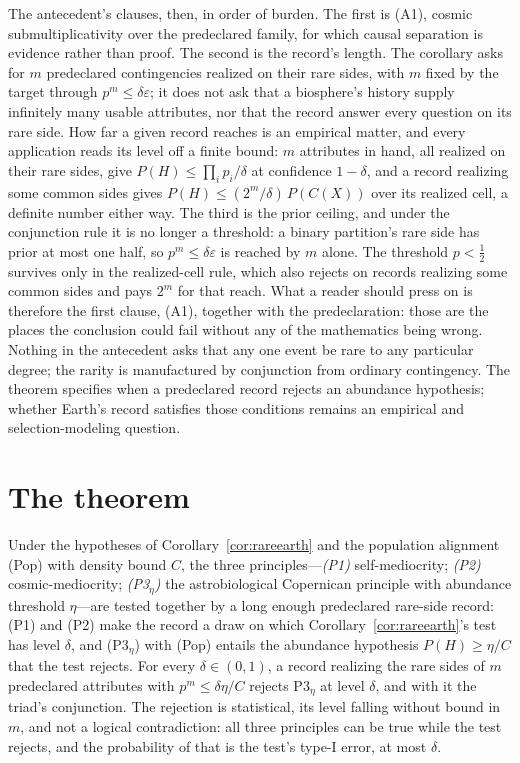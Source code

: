 The antecedent's clauses, then, in order of burden. The first is {\rm (A1)}, cosmic submultiplicativity over the predeclared family, for which causal separation is evidence rather than proof. The second is the record's length. The corollary asks for $m$ predeclared contingencies realized on their rare sides, with $m$ fixed by the target through $p^m \le \delta\varepsilon$; it does not ask that a biosphere's history supply infinitely many usable attributes, nor that the record answer every question on its rare side. How far a given record reaches is an empirical matter, and every application reads its level off a finite bound: $m$ attributes in hand, all realized on their rare sides, give $P(H) \le \prod_i p_i/\delta$ at confidence $1-\delta$, and a record realizing some common sides gives $P(H) \le (2^m/\delta)\, P(C(X))$ over its realized cell, a definite number either way. The third is the prior ceiling, and under the conjunction rule it is no longer a threshold: a binary partition's rare side has prior at most one half, so $p^m \le \delta\varepsilon$ is reached by $m$ alone. The threshold $p < \tfrac12$ survives only in the realized-cell rule, which also rejects on records realizing some common sides and pays $2^m$ for that reach. What a reader should press on is therefore the first clause, {\rm (A1)}, together with the predeclaration: those are the places the conclusion could fail without any of the mathematics being wrong. Nothing in the antecedent asks that any one event be rare to any particular degree; the rarity is manufactured by conjunction from ordinary contingency. The theorem specifies when a predeclared record rejects an abundance hypothesis; whether Earth's record satisfies those conditions remains an empirical and selection-modeling question.

\section{The theorem}
\label{sec:theorem}

\begin{theorem}
\label{thm:triad}
Under the hypotheses of Corollary~\ref{cor:rareearth} and the population alignment {\rm (Pop)} with density bound $C$, the three principles---\emph{(P1)} self-mediocrity; \emph{(P2)} cosmic-mediocrity; \emph{(P3$_\eta$)} the astrobiological Copernican principle with abundance threshold $\eta$---are tested together by a long enough predeclared rare-side record: (P1) and (P2) make the record a draw on which Corollary~\ref{cor:rareearth}'s test has level $\delta$, and (P3$_\eta$) with (Pop) entails the abundance hypothesis $P(H) \ge \eta/C$ that the test rejects. For every $\delta \in (0,1)$, a record realizing the rare sides of $m$ predeclared attributes with $p^m \le \delta\eta/C$ rejects $\mathrm{P3}_\eta$ at level $\delta$, and with it the triad's conjunction. The rejection is statistical, its level falling without bound in $m$, and not a logical contradiction: all three principles can be true while the test rejects, and the probability of that is the test's type-I error, at most $\delta$.
\end{theorem}

